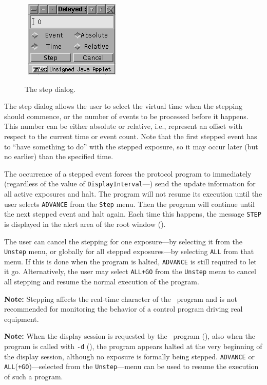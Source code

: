 \begin{figure}[htbp]%
\begin{center}
\ \includegraphics{FIGURES/dsdstep.png}
\caption{The step dialog.\label{fig.dsdstep}}%
\end{center}
\end{figure}%

The step dialog allows the user to select the virtual time when the
stepping should commence, or the number of events to be processed before
it happens.
This number can be either absolute or relative, i.e., represent an offset
with respect to the current time or event count.
Note that the first stepped event has to ``have something to do'' with the
stepped exposure, so it may occur later (but no earlier)
than the specified time.

The occurrence of a stepped event forces the protocol program to
immediately (regardless of the value of
{\tt DisplayInterval}---) send the update information for
all active exposures and halt.
The program will not resume its execution until the user selects
{\tt ADVANCE} from the {\tt Step} menu.
Then the program will continue until the next stepped event and halt again.
Each time this happens, the message {\tt STEP} is displayed in the
alert area of the root window ().

The user can cancel the stepping for one exposure---by selecting it from the
{\tt Unstep} menu, or globally for all stepped exposures---by selecting
{\tt ALL} from that menu.
If this is done when the program is halted, {\tt ADVANCE} is still required
to let it go.
Alternatively, the user may select {\tt ALL+GO} from the {\tt Unstep}
menu to cancel all stepping and resume the normal execution of the program.

\medskip
\noindent
{\bf Note:}
Stepping affects the real-time character of the \smurph\ program and is not
recommended for monitoring the behavior of a control
program driving real equipment.

\medskip
\noindent
{\bf Note:}
When the display session is requested by the \smurph\ program
(), also when the program is called with {\tt -d} 
(), the program appears halted at the very beginning of the
display session, although no exposure is formally being stepped.
{\tt ADVANCE} or {\tt ALL}({\tt +GO})---selected from the
{\tt Unstep}---menu can be used to resume the execution of such a program.

